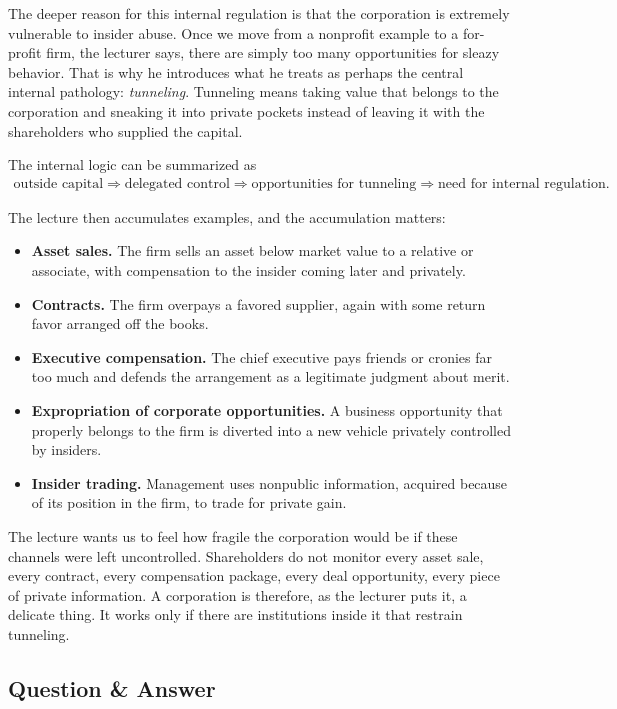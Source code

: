 The deeper reason for this internal regulation is that the corporation is extremely vulnerable to insider abuse. Once we move from a nonprofit example to a for-profit firm, the lecturer says, there are simply too many opportunities for sleazy behavior. That is why he introduces what he treats as perhaps the central internal pathology: \emph{tunneling}. Tunneling means taking value that belongs to the corporation and sneaking it into private pockets instead of leaving it with the shareholders who supplied the capital.

The internal logic can be summarized as
\begin{align}
\text{outside capital}
\Rightarrow
\text{delegated control}
\Rightarrow
\text{opportunities for tunneling}
\Rightarrow
\text{need for internal regulation}.
\end{align}

The lecture then accumulates examples, and the accumulation matters:
\begin{itemize}
\item \textbf{Asset sales.} The firm sells an asset below market value to a relative or associate, with compensation to the insider coming later and privately.
\item \textbf{Contracts.} The firm overpays a favored supplier, again with some return favor arranged off the books.
\item \textbf{Executive compensation.} The chief executive pays friends or cronies far too much and defends the arrangement as a legitimate judgment about merit.
\item \textbf{Expropriation of corporate opportunities.} A business opportunity that properly belongs to the firm is diverted into a new vehicle privately controlled by insiders.
\item \textbf{Insider trading.} Management uses nonpublic information, acquired because of its position in the firm, to trade for private gain.
\end{itemize}

The lecture wants us to feel how fragile the corporation would be if these channels were left uncontrolled. Shareholders do not monitor every asset sale, every contract, every compensation package, every deal opportunity, every piece of private information. A corporation is therefore, as the lecturer puts it, a delicate thing. It works only if there are institutions inside it that restrain tunneling.

\subsection{Question \& Answer}

